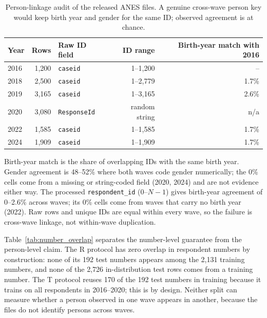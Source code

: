 \begin{table}[h]
\centering
\small
\caption{Person-linkage audit of the released ANES files. A genuine cross-wave
person key would keep birth year and gender for the same ID; observed agreement is
at chance.}
\label{tab:person_linkage}
\begin{tabular}{lrlrr}
\toprule
Year & Rows & Raw ID field & ID range & Birth-year match with 2016 \\
\midrule
2016 & 1,200 & \texttt{caseid} & 1--1,200 & -- \\
2018 & 2,500 & \texttt{caseid} & 1--2,779 & 1.7\% \\
2019 & 3,165 & \texttt{caseid} & 1--3,165 & 2.6\% \\
2020 & 3,080 & \texttt{ResponseId} & random string & n/a \\
2022 & 1,585 & \texttt{caseid} & 1--1,585 & 1.7\% \\
2024 & 1,909 & \texttt{caseid} & 1--1,909 & 1.7\% \\
\bottomrule
\end{tabular}
\par\smallskip\footnotesize
Birth-year match is the share of overlapping IDs with the same birth year. Gender
agreement is 48--52\% where both waves code gender numerically; the 0\% cells
come from a missing or string-coded field (2020, 2024) and are not evidence
either way. The processed \texttt{respondent\_id} (0--$N-1$) gives birth-year
agreement of 0--2.6\% across waves; its 0\% cells come from waves that carry no
birth year (2022). Raw rows and unique IDs are equal within every wave, so the
failure is cross-wave linkage, not within-wave duplication.
\end{table}

Table~\ref{tab:number_overlap} separates the number-level guarantee from the
person-level claim. The R protocol has zero overlap in respondent numbers by
construction: none of its 192 test numbers appears among the 2,131 training
numbers, and none of the 2,726 in-distribution test rows comes from a training
number. The T protocol reuses 170 of the 192 test numbers in training because it
trains on all respondents in 2016--2020; this is by design.
Neither split can measure whether a person observed in one wave appears in
another, because the files do not identify persons across waves.

